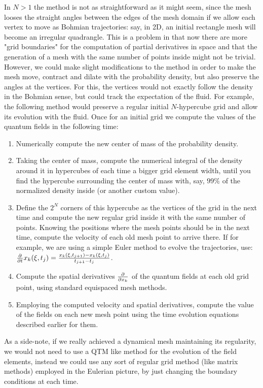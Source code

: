 \documentclass[11pt, a4paper]{article} %
\begin{document}
In $N>1$ the method is not as straightforward as it might seem, since the mesh looses the straight angles between the edges of the mesh domain if we allow each vertex to move as Bohmian trajectories: say, in 2D, an initial rectangle mesh will become an irregular quadrangle. This is a problem in that now there are more "grid boundaries" for the computation of partial derivatives in space and that the generation of a mesh with the same number of points inside might not be trivial. However, we could make slight modifications to the method in order to make the mesh move, contract and dilate with the probability density, but also preserve the angles at the vertices. For this, the vertices would not exactly follow the density in the Bohmian sense, but could track the expectation of the fluid. For example, the following method would preserve a regular initial $N$-hypercube grid and allow its evolution with the fluid. Once for an initial grid we compute the values of the quantum fields in the following time:
\begin{enumerate}
\item Numerically compute the new center of mass of the probability density.
\item Taking the center of mass, compute the numerical integral of the density around it in hypercubes of each time a bigger grid element width, until you find the hypercube surrounding the center of mass with, say, $99\%$ of the normalized density inside (or another custom value).
\item Define the $2^N$ corners of this hypercube as the vertices of the grid in the next time and compute the new regular grid inside it with the same number of points. Knowing the positions where the mesh points should be in the next time, compute the velocity of each old mesh point to arrive there. If for example, we are using a simple Euler method to evolve the trajectories, use: $\pdv{}{t}x_k(\xi,t_{j})=\frac{x_k(\xi,t_{j+1})-x_k(\xi,t_{j})}{t_{j+1}-t_j}$.
\item Compute the spatial derivatives $\pdv{}{x_k}$ of the quantum fields at each old grid point, using standard equispaced mesh methods.
\item Employing the computed velocity and spatial derivatives, compute the value of the fields on each new mesh point using the time evolution equations described earlier for them.
\end{enumerate}

As a side-note, if we really achieved a dynamical mesh maintaining its regularity, we would not need to use a QTM like method for the evolution of the field elements, instead we could use any sort of regular grid method (like matrix methods) employed in the Eulerian picture, by just changing the boundary conditions at each time.
\end{document}

